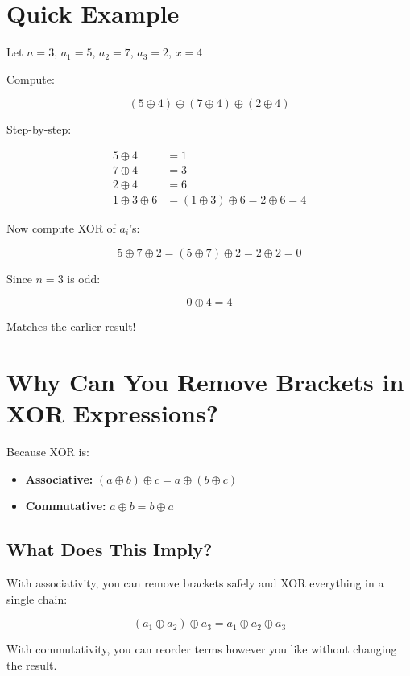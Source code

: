 \documentclass{article}
\begin{document}
\section*{Quick Example}

Let \( n = 3 \), \( a_1 = 5 \), \( a_2 = 7 \), \( a_3 = 2 \), \( x = 4 \)

Compute:

\[
(5 \oplus 4) \oplus (7 \oplus 4) \oplus (2 \oplus 4)
\]

Step-by-step:

\begin{align*}
5 \oplus 4 &= 1 \\
7 \oplus 4 &= 3 \\
2 \oplus 4 &= 6 \\
1 \oplus 3 \oplus 6 &= (1 \oplus 3) \oplus 6 = 2 \oplus 6 = 4
\end{align*}

Now compute XOR of \( a_i \)'s:

\[
5 \oplus 7 \oplus 2 = (5 \oplus 7) \oplus 2 = 2 \oplus 2 = 0
\]

Since \( n = 3 \) is odd:

\[
0 \oplus 4 = 4
\]

Matches the earlier result!

\section*{Why Can You Remove Brackets in XOR Expressions?}

Because XOR is:

\begin{itemize}
  \item \textbf{Associative:} \( (a \oplus b) \oplus c = a \oplus (b \oplus c) \)
  \item \textbf{Commutative:} \( a \oplus b = b \oplus a \)
\end{itemize}

\subsection*{What Does This Imply?}

With associativity, you can remove brackets safely and XOR everything in a single chain:

\[
(a_1 \oplus a_2) \oplus a_3 = a_1 \oplus a_2 \oplus a_3
\]

With commutativity, you can reorder terms however you like without changing the result.
\end{document}
